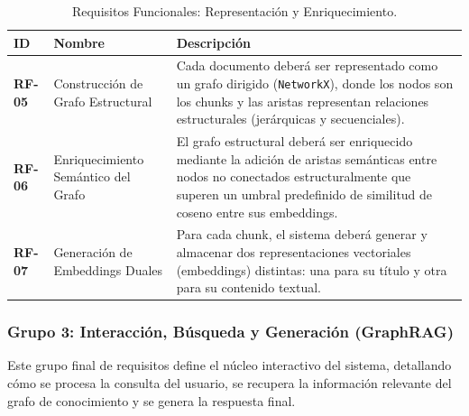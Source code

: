 \begin{table}[H]
\centering
\renewcommand{\arraystretch}{1.4}
\caption{Requisitos Funcionales: Representación y Enriquecimiento.}
\label{tab:rf_representacion}
\begin{tabularx}{\textwidth}{|l|l|X|}
\hline
\textbf{ID} & \textbf{Nombre} & \textbf{Descripción} \\
\hline
\textbf{RF-05} & Construcción de Grafo Estructural & Cada documento deberá ser representado como un grafo dirigido (\texttt{NetworkX}), donde los nodos son los chunks y las aristas representan relaciones estructurales (jerárquicas y secuenciales). \\
\hline
\textbf{RF-06} & Enriquecimiento Semántico del Grafo & El grafo estructural deberá ser enriquecido mediante la adición de aristas semánticas entre nodos no conectados estructuralmente que superen un umbral predefinido de similitud de coseno entre sus embeddings. \\
\hline
\textbf{RF-07} & Generación de Embeddings Duales & Para cada chunk, el sistema deberá generar y almacenar dos representaciones vectoriales (embeddings) distintas: una para su título y otra para su contenido textual. \\
\hline
\end{tabularx}
\end{table}

\newpage
\subsubsection*{Grupo 3: Interacción, Búsqueda y Generación (GraphRAG)}
Este grupo final de requisitos define el núcleo interactivo del sistema, detallando cómo se procesa la consulta del usuario, se recupera la información relevante del grafo de conocimiento y se genera la respuesta final.

